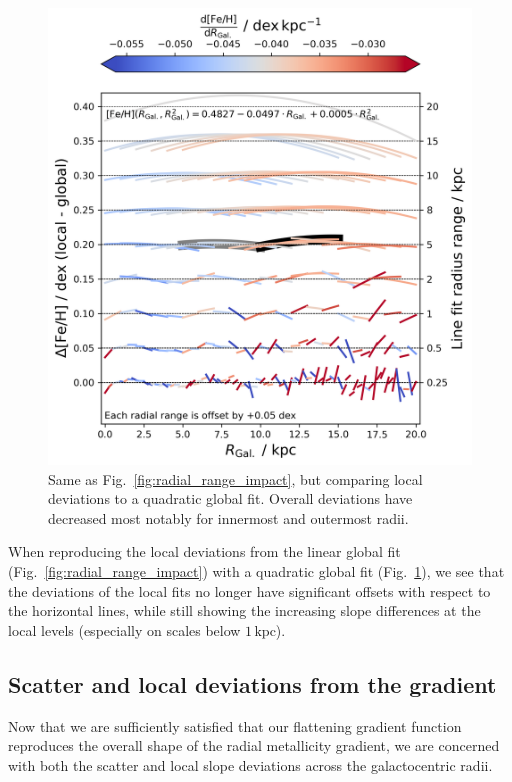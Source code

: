 \documentclass[fleqn,usenatbib]{mnras}
\begin{document}
\begin{figure}
    \centering
    \includegraphics[width=\columnwidth]{figures/radial_range_impact_quadratic.png}
    \caption{Same as Fig.~\ref{fig:radial_range_impact}, but comparing local deviations to a quadratic global fit. Overall deviations have decreased most notably for innermost and outermost radii.}
    \label{fig:radial_range_impact_quadratic}
\end{figure}

When reproducing the local deviations from the linear global fit (Fig.~\ref{fig:radial_range_impact}) with a quadratic global fit (Fig.~\ref{fig:radial_range_impact_quadratic}), we see that the deviations of the local fits no longer have significant offsets with respect to the horizontal lines, while still showing the increasing slope differences at the local levels (especially on scales below $1\,\mathrm{kpc}$). 

\subsection{Scatter and local deviations from the gradient}
\label{sec:scatter_radial_metallicity_gradients}

Now that we are sufficiently satisfied that our flattening gradient function reproduces the overall shape of the radial metallicity gradient, we are concerned with both the scatter and local slope deviations across the galactocentric radii.
\end{document}
